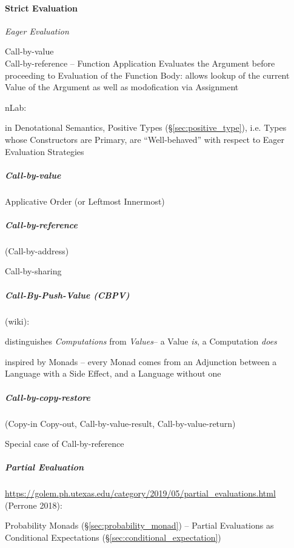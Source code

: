 \paragraph{Strict Evaluation}\label{sec:strict_evaluation}\hfill

\emph{Eager Evaluation}

Call-by-value \\
Call-by-reference -- Function Application Evaluates the Argument
before proceeding to Evaluation of the Function Body: allows lookup of
the current Value of the Argument as well as modofication via
Assignment

nLab:

in Denotational Semantics, Positive Types (\S\ref{sec:positive_type}),
i.e. Types whose Constructors are Primary, are ``Well-behaved'' with
respect to Eager Evaluation Strategies



\subparagraph{Call-by-value}\label{sec:call_by_value}\hfill

Applicative Order (or Leftmost Innermost)



\subparagraph{Call-by-reference}\label{sec:call_by_reference}\hfill

(Call-by-address)

Call-by-sharing



\subparagraph{Call-By-Push-Value (CBPV)}\label{sec:cbpv}\hfill

(wiki):

distinguishes \emph{Computations} from \emph{Values}-- a Value \emph{is}, a
Computation \emph{does}

inspired by Monads -- every Monad comes from an Adjunction between a Language
with a Side Effect, and a Language without one



\subparagraph{Call-by-copy-restore}\label{sec:call_by_copy_restore}\hfill

(Copy-in Copy-out, Call-by-value-result, Call-by-value-return)

Special case of Call-by-reference



\subparagraph{Partial Evaluation}\label{sec:partial_evaluation}\hfill

\url{https://golem.ph.utexas.edu/category/2019/05/partial_evaluations.html}
(Perrone 2018):

Probability Monads (\S\ref{sec:probability_monad}) -- Partial Evaluations as
Conditional Expectations (\S\ref{sec:conditional_expectation})




